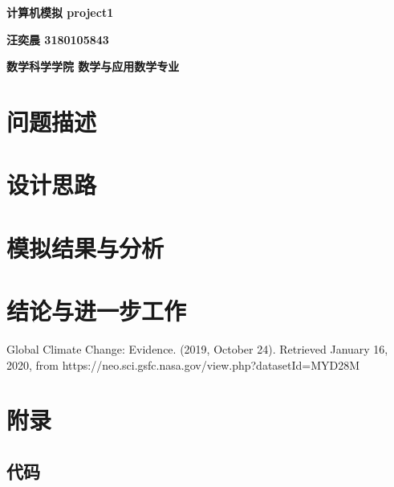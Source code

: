 \documentclass[12pt]{article}
\begin{document}
\pagestyle{fancy}
\setcounter{page}{1}
\vspace{20pt}
\centerline{{\Large \textbf{计算机模拟 project1}}}
\vspace{15pt}

\centerline{{\large \textbf{汪奕晨 3180105843}}}
\vspace{15pt}

\centerline{{\large \textbf{数学科学学院 数学与应用数学专业}}}
\vspace{15pt}

\section{问题描述}

\section{设计思路}

\section{模拟结果与分析}

\section{结论与进一步工作}



\begin{thebibliography}{99}
  Global Climate Change: Evidence. (2019, October 24). Retrieved January 16, 2020, from https://neo.sci.gsfc.nasa.gov/view.php?datasetId=MYD28M
  
\end{thebibliography}

% 
% 
\newpage
\section*{附录}
\subsection*{代码}
\end{document}
